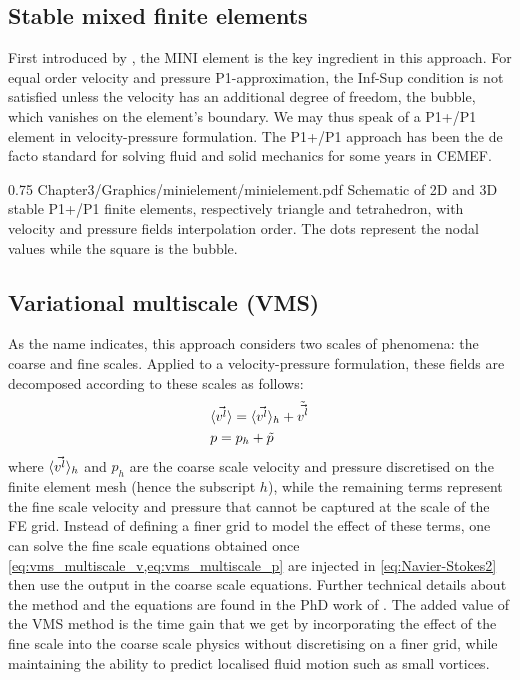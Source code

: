 \subsection{Stable mixed finite elements}
First introduced by \citet{arnold_stable_1984}, the MINI element is the key ingredient in this approach.
For equal order velocity and pressure P1-approximation, the Inf-Sup condition is not satisfied unless the velocity
has an additional degree of freedom, the bubble, which vanishes on the element's boundary. We may thus speak of a
P1+/P1 element in velocity-pressure formulation. The P1+/P1 approach has been the de facto standard for solving fluid 
and solid mechanics for some years in CEMEF.
%
\begin{figureth}
{0.75}
{Chapter3/Graphics/minielement/minielement.pdf}
{Schematic of 2D and 3D stable P1+/P1 finite elements, respectively triangle and tetrahedron, with velocity and pressure fields interpolation order.
The dots represent the nodal values while the square is the bubble.}
\label{fig:minielement}
\end{figureth}
%
\subsection{Variational multiscale (VMS)}
As the name indicates, this approach considers two scales of phenomena: the coarse and fine scales. Applied to a velocity-pressure
formulation, these fields are decomposed according to these scales as follows:
\begin{align}
\label{eq:vms_multiscale_v}
 &\langle \vec{v^l} \rangle = \langle \vec{v^l} \rangle_h + \tilde{\vec{v^l}} \\ 
\label{eq:vms_multiscale_p}
 &p = p_h + \tilde{p}
\end{align}
where $\langle \vec{v^l} \rangle_h$ and $p_h$ are the coarse scale velocity and pressure discretised on the finite element mesh (hence the subscript $h$), 
while the remaining terms represent the fine scale velocity and pressure that cannot be captured at the scale of the FE grid. Instead 
of defining a finer grid to model the effect of these terms, one can solve the fine scale equations obtained once \cref{eq:vms_multiscale_v,eq:vms_multiscale_p}
are injected in \cref{eq:Navier-Stokes2} then use the output in the coarse scale equations. Further technical details about the method and the equations are
found in the PhD work of \citet{hachem_stabilized_2009}. The added value of the VMS method is the time gain that we get by incorporating the effect of the fine scale into the 
coarse scale physics without discretising on a finer grid, while maintaining the ability to predict localised fluid motion such as small vortices.
%
%
